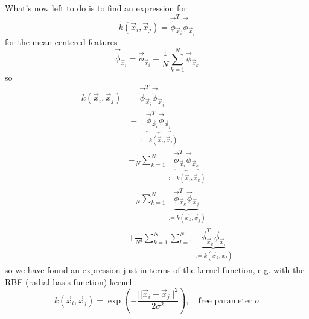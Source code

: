 What's now left to do is to find an expression for
\begin{equation}
    \tilde{k}(\vec{x}_i,\vec{x}_j) = \vec{\tilde{\phi}}_{\vec{x}_i}^T \vec{\tilde{\phi}}_{\vec{x}_j}
\end{equation}
for the mean centered features
\begin{equation}
    \vec{\tilde{\phi}}_{\vec{x}_i} = \vec{\phi}_{\vec{x}_i} - \frac{1}{N} \sum_{k=1}^{N} \vec{\phi}_{\vec{x}_k}
\end{equation}
so
\begin{equation}
    \begin{aligned}
        \tilde{k}(\vec{x}_i,\vec{x}_j) &= \vec{\tilde{\phi}}_{\vec{x}_i}^T \vec{\tilde{\phi}}_{\vec{x}_j} \\
                                       &= \underbrace{\vec{\phi}_{\vec{x}_i}^T \vec{\phi}_{\vec{x}_j}}_{:=k(\vec{x}_i,\vec{x}_j)} \\
                                       &- \frac{1}{N} \sum_{k=1}^{N} \underbrace{\vec{\phi}_{\vec{x}_i}^T \vec{\phi}_{\vec{x}_k}}_{:=k(\vec{x}_i,\vec{x}_k)}\\
                                       &- \frac{1}{N} \sum_{k=1}^{N} \underbrace{\vec{\phi}_{\vec{x}_k}^T \vec{\phi}_{\vec{x}_j}}_{:=k(\vec{x}_k,\vec{x}_j)} \\
                                       &+ \frac{1}{N^2} \sum_{k=1}^{N} \sum_{l=1}^{N} \underbrace{\vec{\phi}_{\vec{x}_k}^T \vec{\phi}_{\vec{x}_l}}_{:=k(\vec{x}_k,\vec{x}_l)}
    \end{aligned}
\end{equation}
so we have found an expression just in terms of the kernel function, e.g. with
the RBF (radial basis function) kernel
\begin{equation}
    k(\vec{x}_i, \vec{x}_j) = \exp\left( - \frac{||\vec{x}_i - \vec{x}_j||^2}{2\sigma^2} \right), \quad \text{free parameter } \sigma
\end{equation}

